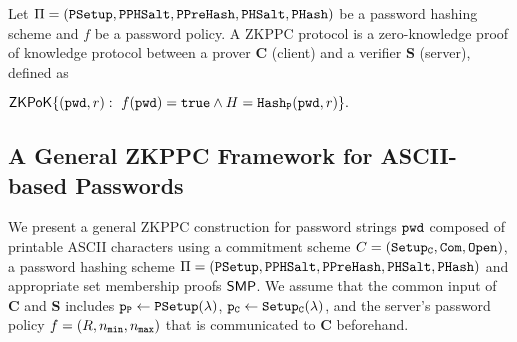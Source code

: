 \begin{definition}[ZKPPC]\label{def:pocopas}
Let $\Pi=(\mathtt{PSetup},\allowbreak\mathtt{PPHSalt},\allowbreak\mathtt{PPreHash},\mathtt{PHSalt},\allowbreak\mathtt{PHash})$ be a password hashing scheme and $f$ be a password policy. A ZKPPC protocol is a zero-knowledge proof of knowledge protocol between a prover $\bm{C}$ (client) and a verifier $\bm{S}$ (server), defined as
\begin{center}$\mathsf{ZKPoK}\{(\mathtt{pwd},r):~f(\mathtt{pwd})=\mathtt{true} \wedge H=\mathtt{Hash_P}(\mathtt{pwd},r)\}.$\end{center}
\eod
\end{definition}


\subsection{A General ZKPPC Framework for ASCII-based Passwords} \label{sec:genconstruction}
We present a general ZKPPC construction for password strings $\mathtt{pwd}$ composed of printable ASCII characters using a commitment scheme $C=(\mathtt{Setup_C},\mathtt{Com},\mathtt{Open})$, a password hashing scheme $\Pi=(\mathtt{PSetup},\mathtt{PPHSalt},\allowbreak\mathtt{PPreHash},\allowbreak\mathtt{PHSalt},\allowbreak\mathtt{PHash})$ and appropriate set membership proofs $\mathsf{SMP}$. We assume that the common input of $\bm{C}$ and $\bm{S}$ includes $\mathtt{p_P}\gets\mathtt{PSetup}(\lambda)$, $\mathtt{p_C}\gets\mathtt{Setup_C}(\lambda)$, and the server's password policy $f=(R, {n_\mathtt{min}}, {n_\mathtt{max}})$ that is communicated to $\bm{C}$ beforehand.

